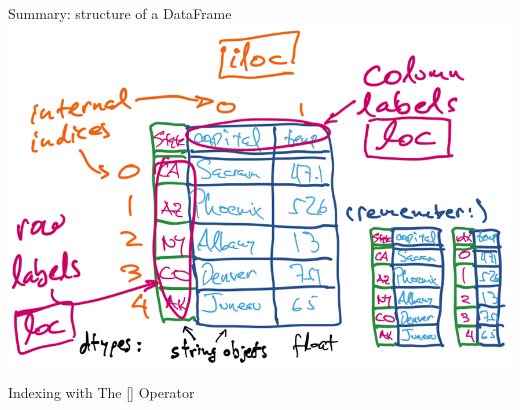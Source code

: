 \documentclass[aspectratio=169]{../latex_main/tntbeamer}  %
\begin{document}
	\begin{frame}{Summary: structure of a DataFrame}
    	\centering
	    \includegraphics[scale=.5]{Bild10}
	\end{frame}
	
	\begin{frame}{Indexing with The [] Operator}

	\end{frame}
	
\end{document}
